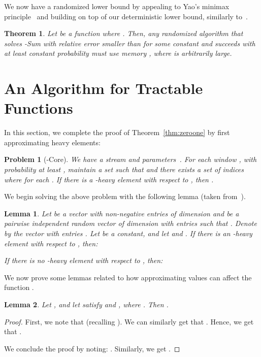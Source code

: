 \documentclass[11pt]{article}
\newtheorem{lem}{Lemma}
\newtheorem{thm}{Theorem}
\newtheorem{prob}{Problem}
\begin{document}
We now have a randomized lower bound by appealing to Yao's minimax principle~\cite{MR95} and building on top of our
deterministic lower bound, similarly to~\cite{DGIM02}.
\begin{thm}\label{thm:rlb}
Let  be a function where .  Then, any randomized algorithm that solves
-Sum with relative error smaller than  for some constant  and
succeeds with at least constant probability  must use memory , where 
is arbitrarily large.
\end{thm}


\section{An Algorithm for Tractable Functions}\label{sec:tract}
In this section, we complete the proof of Theorem~\ref{thm:zeroone} by first approximating heavy elements:
\begin{prob}[-Core]\label{prob:heavy}
We have a stream  and parameters~.  For each window , with probability at least ,
maintain a set  such that
 and there exists a set of indices  where 
for each .  If there is a -heavy element  with respect to , then .
\end{prob}

We begin solving the above problem with the following lemma (taken from~\cite{BO10}).

\begin{lem}\label{lem:majorseparation}
Let  be a vector with non-negative entries of dimension  and  be a pairwise independent random vector
of dimension  with entries  such that .   Denote
by  the vector with entries .  Let  be a constant, and let 
and .
If there is an -heavy element  with respect to , then:

If there is no -heavy element with respect to , then:

\end{lem}

We now prove some lemmas related to how approximating values can affect the function .

\begin{lem}\label{lem:Gapprox}
Let , and let  satisfy  and
, where .
Then .
\end{lem}
\begin{proof}
First, we note that  (recalling ).  We can
similarly get that .
Hence, we get that .

We conclude the proof by noting: .  Similarly, we get
.
\end{proof}
\end{document}
